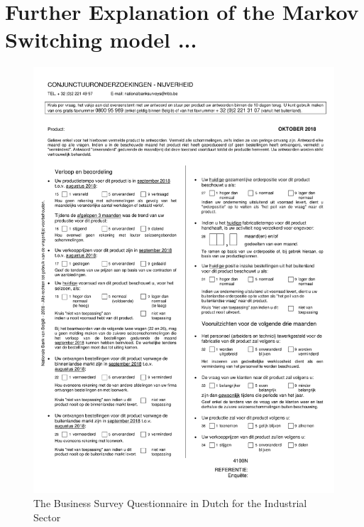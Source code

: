 \documentclass[12pt,a4paper,oneside]{book}
\begin{document}
\newpage
\section*{Further Explanation of the Markov Switching model ...}


\newpage
\begin{figure}[H]
    \centering
    \includegraphics[scale=0.75]{Images/IndustryN.pdf}
    \caption{The Business Survey Questionnaire in Dutch for the Industrial Sector}
    \label{B_pred}
\end{figure}
\end{document}
